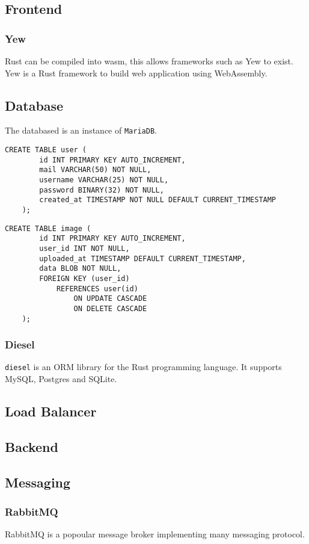 \documentclass[../documentation.tex]{subfiles}
\begin{document}
\subsection{Frontend}

\subsubsection{Yew}

Rust can be compiled into wasm, this allows frameworks such as Yew to exist.
Yew is a Rust framework to build web application using WebAssembly.

\subsection{Database}

The databased is an instance of \texttt{MariaDB}.

\begin{lstlisting}[style=sql]
    CREATE TABLE user (
        id INT PRIMARY KEY AUTO_INCREMENT,
        mail VARCHAR(50) NOT NULL,
        username VARCHAR(25) NOT NULL,
        password BINARY(32) NOT NULL,
        created_at TIMESTAMP NOT NULL DEFAULT CURRENT_TIMESTAMP
    );
\end{lstlisting}

\begin{lstlisting}[style=sql]
    CREATE TABLE image (
        id INT PRIMARY KEY AUTO_INCREMENT,
        user_id INT NOT NULL,
        uploaded_at TIMESTAMP DEFAULT CURRENT_TIMESTAMP,
        data BLOB NOT NULL,
        FOREIGN KEY (user_id)
            REFERENCES user(id)
                ON UPDATE CASCADE
                ON DELETE CASCADE
    );
\end{lstlisting}

\subsubsection{Diesel}

\texttt{diesel} is an ORM library for the Rust programming language.
It supports MySQL, Postgres and SQLite.

\subsection{Load Balancer}

\subsection{Backend}

\subsection{Messaging}

\subsubsection{RabbitMQ}

RabbitMQ is a popoular message broker implementing many messaging protocol.
\end{document}
